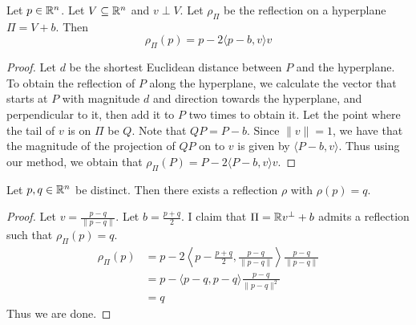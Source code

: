 \documentclass[a4paper]{article}
\begin{document}
\begin{lmm}{}{} Let $p\in\mathbb{R}^n$. Let $V\subseteq\mathbb{R}^n$ and $v\perp V$. Let $\rho_\Pi$ be the reflection on a hyperplane $\Pi=V+b$. Then $$\rho_\Pi(p)=p-2\langle p-b, v\rangle v$$\tcbline
\begin{proof}
Let $d$ be the shortest Euclidean distance between $P$ and the hyperplane. To obtain the reflection of $P$ along the hyperplane, we calculate the vector that starts at $P$ with magnitude $d$ and direction towards the hyperplane, and perpendicular to it, then add it to $P$ two times to obtain it. \linebreak\linebreak
Let the point where the tail of $v$ is on $\Pi$ be $Q$. Note that $QP=P-b$. Since $\|v\|=1$, we have that the magnitude of the projection of $QP$ on to $v$ is given by $\langle P-b,v\rangle$. Thus using our method, we obtain that $\rho_\Pi(P)=P-2\langle P-b,v\rangle v$. 
\end{proof}
\end{lmm}

\begin{lmm}{}{} Let $p,q\in\mathbb{R}^n$ be distinct. Then there exists a reflection $\rho$ with $\rho(p)=q$. \tcbline
\begin{proof}
Let $v=\frac{p-q}{\|p-q\|}$. Let $b=\frac{p+q}{2}$. I claim that $\Pi=\mathbb{R} v^\perp+b$ admits a reflection such that $\rho_\Pi(p)=q$. 
\begin{align*}
\rho_\Pi(p)&=p-2\left\langle p-\frac{p+q}{2},\frac{p-q}{\|p-q\|}\right\rangle \frac{p-q}{\|p-q\|}\\
&=p-\langle p-q,p-q\rangle\frac{p-q}{\|p-q\|^2}\\
&=q
\end{align*}
Thus we are done. 
\end{proof}
\end{lmm}
\end{document}
